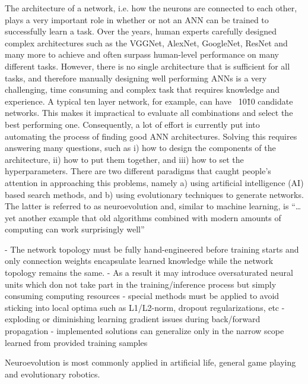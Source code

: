 \documentclass[journal, a4paper]{IEEEtran}
\begin{document}
The architecture of a network, i.e. how the neurons are connected to each other, plays a very important role in whether or not an ANN can be trained to successfully learn a task. Over the years, human experts carefully designed complex architectures such as the VGGNet, AlexNet, GoogleNet, ResNet and many more to achieve and often surpass human-level performance on many different tasks. However, there is no single architecture that is sufficient for all tasks, and therefore manually designing well performing ANNs is a very challenging, time consuming and complex task that requires knowledge and experience. A typical ten layer network, for example, can have ~10\^10 candidate networks. This makes it impractical to evaluate all combinations and select the best performing one. \cite{cite05}
Consequently, a lot of effort is currently put into automating the process of finding good ANN architectures. Solving this requires answering many questions, such as i) how to design the components of the architecture, ii) how to put them together, and iii) how to set the hyperparameters. There are two different paradigms that caught people’s attention in approaching this problems, namely a) using artificial intelligence (AI) based search methods, and b) using evolutionary techniques to generate networks. The latter is referred to as neuroevolution and, similar to machine learning, is “… yet another example that old algorithms combined with modern amounts of computing can work surprisingly well” \cite{cite05}

- The network topology must be fully hand-engineered before training starts and only connection weights encapsulate learned knowledge while the network topology remains the same.
- As a result it may introduce oversaturated neural units which don not take part in the training/inference process but simply consuming computing resources
- special methods must be applied to avoid sticking into local optima such as L1/L2-norm, dropout regularizations, etc
- exploding or diminishing learning gradient issues during back/forward propagation
- implemented solutions can generalize only in the narrow scope learned from provided training samples


Neuroevolution is most commonly applied in artificial life, general game playing and evolutionary robotics.
\end{document}
